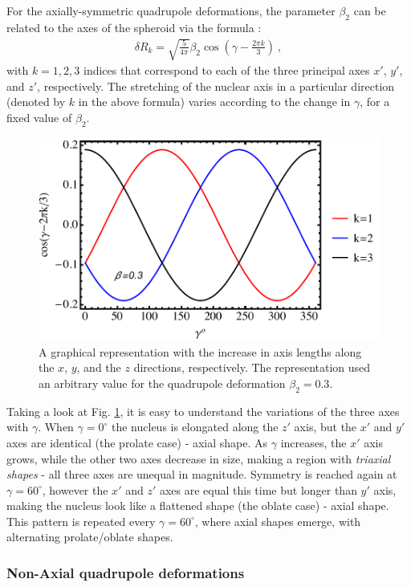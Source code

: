For the axially-symmetric quadrupole deformations, the parameter $\beta_2$ can be related to the axes of the spheroid via the formula \cite{greiner1996nuclear}:
\begin{align}
    \delta R_k=\sqrt{\frac{5}{4\pi}}\beta_2\cos\left(\gamma-\frac{2\pi k}{3}\right)\ ,
\end{align}
with $k=1,2,3$ indices that correspond to each of the three principal axes $x'$, $y'$, and $z'$, respectively. The stretching of the nuclear axis in a particular direction (denoted by $k$ in the above formula) varies according to the change in $\gamma$, for a fixed value of $\beta_2$.

\begin{figure}
    \centering
    \includegraphics[scale=0.65]{Chapters/Figures/nuclear-radius-elongation.pdf}
    \caption{A graphical representation with the increase in axis lengths along the $x$, $y$, and the $z$ directions, respectively. The representation used an arbitrary value for the quadrupole deformation $\beta_2=0.3$.}
    \label{nuclear-radius-elongation}
\end{figure}

Taking a look at Fig. \ref{nuclear-radius-elongation}, it is easy to understand the variations of the three axes with $\gamma$. When $\gamma=0^\circ$ the nucleus is elongated along the $z'$ axis, but the $x'$ and $y'$ axes are identical (the prolate case) - axial shape. As $\gamma$ increases, the $x'$ axis grows, while the other two axes decrease in size, making a region with \emph{triaxial shapes} - all three axes are unequal in magnitude. Symmetry is reached again at $\gamma=60^\circ$, however the $x'$ and $z'$ axes are equal this time but longer than $y'$ axis, making the nucleus look like a flattened shape (the oblate case) - axial shape. This pattern is repeated every $\gamma=60^\circ$, where axial shapes emerge, with alternating prolate/oblate shapes.

\subsubsection{Non-Axial quadrupole deformations}

